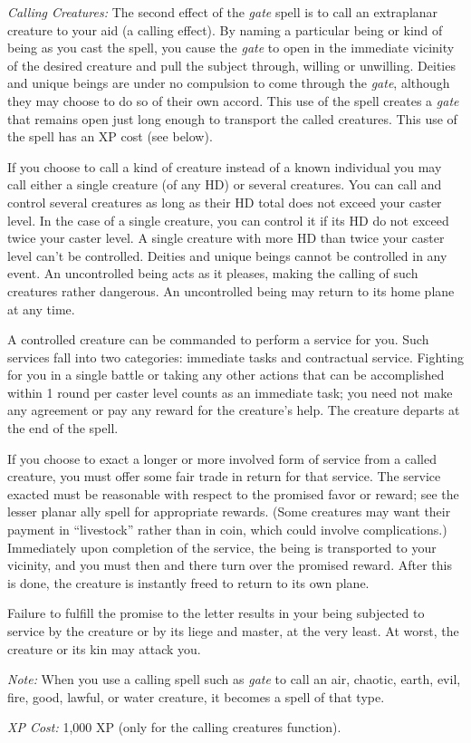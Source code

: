 {	\textit{Calling Creatures:}
	The second effect of the \emph{gate} spell is to call an extraplanar creature to your aid (a calling effect). By naming a particular being or kind of being as you cast the spell, you cause the \emph{gate} to open in the immediate vicinity of the desired creature and pull the subject through, willing or unwilling. Deities and unique beings are under no compulsion to come through the \emph{gate}, although they may choose to do so of their own accord. This use of the spell creates a \emph{gate} that remains open just long enough to transport the called creatures. This use of the spell has an XP cost (see below).

	If you choose to call a kind of creature instead of a known individual you may call either a single creature (of any HD) or several creatures. You can call and control several creatures as long as their HD total does not exceed your caster level. In the case of a single creature, you can control it if its HD do not exceed twice your caster level. A single creature with more HD than twice your caster level can't be controlled. Deities and unique beings cannot be controlled in any event. An uncontrolled being acts as it pleases, making the calling of such creatures rather dangerous. An uncontrolled being may return to its home plane at any time.

	A controlled creature can be commanded to perform a service for you. Such services fall into two categories: immediate tasks and contractual service. Fighting for you in a single battle or taking any other actions that can be accomplished within 1 round per caster level counts as an immediate task; you need not make any agreement or pay any reward for the creature's help. The creature departs at the end of the spell.

	If you choose to exact a longer or more involved form of service from a called creature, you must offer some fair trade in return for that service. The service exacted must be reasonable with respect to the promised favor or reward; see the lesser planar ally spell for appropriate rewards. (Some creatures may want their payment in ``livestock'' rather than in coin, which could involve complications.) Immediately upon completion of the service, the being is transported to your vicinity, and you must then and there turn over the promised reward. After this is done, the creature is instantly freed to return to its own plane.

	Failure to fulfill the promise to the letter results in your being subjected to service by the creature or by its liege and master, at the very least. At worst, the creature or its kin may attack you.

	\textit{Note:} When you use a calling spell such as \emph{gate} to call an air, chaotic, earth, evil, fire, good, lawful, or water creature, it becomes a spell of that type.

	\textit{XP Cost:}
	1,000 XP (only for the calling creatures function).

}
